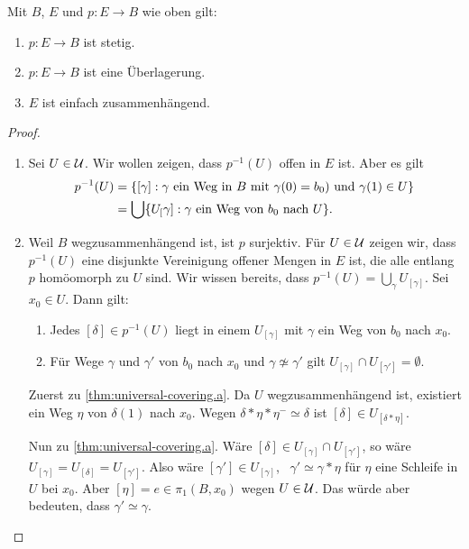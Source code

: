 \begin{theorem}\label{thm:universal-covering}
Mit $B$, $E$ und $p\colon E\to B$ wie oben gilt:
\begin{enumerate}
\item $p\colon E\to B$ ist stetig.
\item $p\colon E \to B$ ist eine Überlagerung.
\item $E$ ist einfach zusammenhängend.
\end{enumerate}
\end{theorem}
\begin{proof}\leavevmode
\begin{enumerate}
\item Sei $U\in \cal U$. Wir wollen zeigen, dass $p^{-1}(U)$ offen in $E$ ist. Aber es gilt
\begin{align*}
p^{-1}(U) & = \{[\gamma] : \textnormal{$\gamma$ ein Weg in $B$ mit $\gamma(0) = b_0)$ und $\gamma(1)\in U$}\} \\
& = \bigcup \{ U_[\gamma] : \textnormal{$\gamma$ ein Weg von $b_0$ nach $U$}\}.
\end{align*}
\item Weil $B$ wegzusammenhängend ist, ist $p$ surjektiv. Für $U\in\cal U$ zeigen wir, dass $p^{-1}(U)$ eine disjunkte Vereinigung offener Mengen in $E$ ist, die alle entlang $p$ homöomorph zu $U$ sind. Wir wissen bereits, dass $p^{-1}(U) = \bigcup_{\gamma} U_{[\gamma]}$. Sei $x_0\in U$. Dann gilt:
\begin{enumerate}[label={\normalfont \rmfamily(\alph*)}, nosep]
\item \label{thm:universal-covering.a} Jedes $[\delta]\in p^{-1}(U)$ liegt in einem $U_{[\gamma]}$ mit $\gamma$ ein Weg von $b_0$ nach $x_0$.
\item \label{thm:universal-covering.b} Für Wege $\gamma$ und $\gamma'$ von $b_0$ nach $x_0$ und $\gamma\not\simeq \gamma'$ gilt $U_{[\gamma]}\cap U_{[\gamma']} = \emptyset$.
\end{enumerate}
Zuerst zu \ref{thm:universal-covering.a}. Da $U$ wegzusammenhängend ist, existiert ein Weg $\eta$ von $\delta(1)$ nach $x_0$. Wegen $\delta*\eta*\eta^{-}\simeq\delta$ ist $[\delta]\in U_{[\delta*\eta]}$.

Nun zu \ref{thm:universal-covering.a}. Wäre $[\delta]\in U_{[\gamma]}\cap U_{[\gamma']}$, so wäre $U_{[\gamma]} = U_{[\delta]} = U_{[\gamma']}$. Also wäre $[\gamma']\in U_{[\gamma]}$, \ddh~$\gamma'\simeq \gamma*\eta$ für $\eta$ eine Schleife in $U$ bei $x_0$. Aber $[\eta] = e\in \pi_1(B,x_0)$ wegen $U\in\cal U$. Das würde aber bedeuten, dass $\gamma'\simeq \gamma$.


\end{enumerate}
\end{proof}
